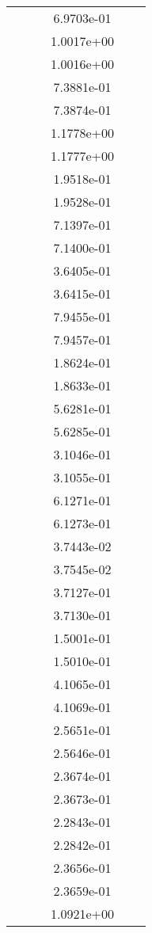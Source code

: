 \begin{xltabular}{\textwidth}{r|rS[table-format=1.3e+2]S[table-format=1.4e+2]S[table-format=1.4e+2]S[table-format=-1.5]}
&  &  & 6.9703e-01 & & \\
&  &  & 1.0017e+00 & & \\
&  &  & 1.0016e+00 & & \\
&  &  & 7.3881e-01 & & \\
&  &  & 7.3874e-01 & & \\
&  &  & 1.1778e+00 & & \\
&  &  & 1.1777e+00 & & \\
&  &  & 1.9518e-01 & & \\
&  &  & 1.9528e-01 & & \\
&  &  & 7.1397e-01 & & \\
&  &  & 7.1400e-01 & & \\
&  &  & 3.6405e-01 & & \\
&  &  & 3.6415e-01 & & \\
&  &  & 7.9455e-01 & & \\
&  &  & 7.9457e-01 & & \\
&  &  & 1.8624e-01 & & \\
&  &  & 1.8633e-01 & & \\
&  &  & 5.6281e-01 & & \\
&  &  & 5.6285e-01 & & \\
&  &  & 3.1046e-01 & & \\
&  &  & 3.1055e-01 & & \\
&  &  & 6.1271e-01 & & \\
&  &  & 6.1273e-01 & & \\
&  &  & 3.7443e-02 & & \\
&  &  & 3.7545e-02 & & \\
&  &  & 3.7127e-01 & & \\
&  &  & 3.7130e-01 & & \\
&  &  & 1.5001e-01 & & \\
&  &  & 1.5010e-01 & & \\
&  &  & 4.1065e-01 & & \\
&  &  & 4.1069e-01 & & \\
&  &  & 2.5651e-01 & & \\
&  &  & 2.5646e-01 & & \\
&  &  & 2.3674e-01 & & \\
&  &  & 2.3673e-01 & & \\
&  &  & 2.2843e-01 & & \\
&  &  & 2.2842e-01 & & \\
&  &  & 2.3656e-01 & & \\
&  &  & 2.3659e-01 & & \\
&  &  & 1.0921e+00 & & \\

\end{xltabular}
